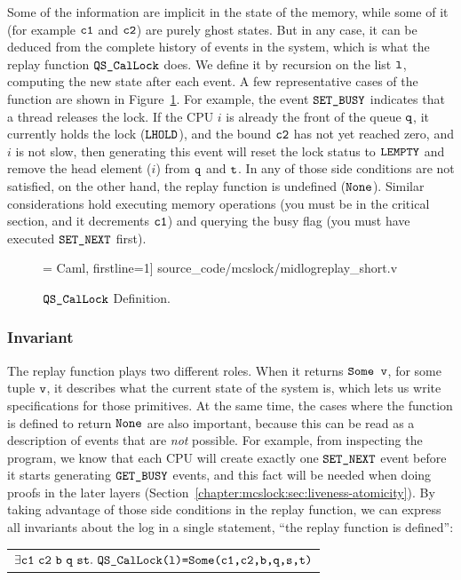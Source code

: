 Some of the information are implicit in the state of the memory, while some of it (for example ${\mathrm{\texttt{c1}}}$ and ${\mathrm{\texttt{c2}}}$) are purely ghost states. But in any case, it can be deduced from the complete history of events in the system, which is what the replay function ${\mathrm{\texttt{QS\_CalLock}}}$ does. We define it by recursion on the list ${\mathrm{\texttt{l}}}$, computing the new state after each event. A few representative cases of the function are shown in Figure~\ref{fig:chapter:mcslock:QS_CalLock}.  For example, the event
${\mathrm{\texttt{SET\_BUSY}}}$ indicates that a thread releases the lock. If the CPU $i$ is already the  front of the queue ${\mathrm{\texttt{q}}}$, it currently holds the lock (${\mathrm{\texttt{LHOLD}}}$), and the bound ${\mathrm{\texttt{c2}}}$ has not yet reached zero, and $i$ is not slow, then generating this event will reset the lock status to ${\mathrm{\texttt{LEMPTY}}}$ and remove the head element ($i$) from ${\mathrm{\texttt{q}}}$ and ${\mathrm{\texttt{t}}}$. In any of those side conditions are not satisfied, on the other hand, the replay function is undefined (${\mathrm{\texttt{None}}}$). Similar
considerations hold executing memory operations (you must be in the critical section, and it decrements ${\mathrm{\texttt{c1}}}$) and querying the busy flag (you must have executed ${\mathrm{\texttt{SET\_NEXT}}}$ first).

\begin{figure}
 = Caml, firstline=1] {source_code/mcslock/midlogreplay_short.v}
    \caption{${\mathrm{\texttt{QS\_CalLock}}}$ Definition.}
\label{fig:chapter:mcslock:QS_CalLock}
\end{figure}


\subsubsection{Invariant} 

The replay function plays two different roles. When it returns ${\mathrm{\texttt{Some}}}{\mathrm{\texttt{ v}}}$, for some tuple ${\mathrm{\texttt{v}}}$, it describes what the current state of the system is, which lets us write  specifications for those primitives. At the same time, the cases where the function is defined to return ${\mathrm{\texttt{None}}}$ are also important, because this can be read as a description of events that are \emph{not} possible. For example, from inspecting the program, we know that each CPU will create
exactly one ${\mathrm{\texttt{SET\_NEXT}}}$  event before it starts generating ${\mathrm{\texttt{GET\_BUSY}}}$ events, and this fact will be needed when doing proofs in the later layers (Section~\ref{chapter:mcslock:sec:liveness-atomicity}). By taking advantage of those  side conditions in the replay function, we can express all  invariants about the log in a single statement, ``the replay function is defined'':\newline
\begin{tabular}{P{0.95\textwidth}}
    $\exists \codeinmath{c1}\ \codeinmath{c2}\ \codeinmath{b}\ \codeinmath{q}\ \codeinmath{s} \codeinmath{t}.\ \QSCalLock\codeinmath{(l)=Some(c1,c2,b,q,s,t)}$\\
\end{tabular}

